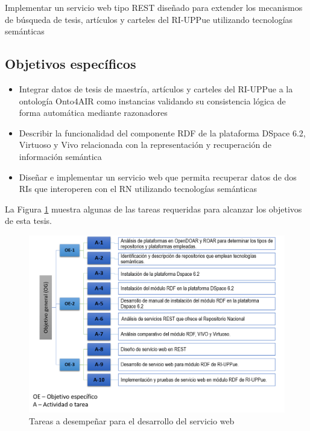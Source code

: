 Implementar un servicio web tipo REST dise\~{n}ado para extender los mecanismos de b\'usqueda de tesis, art\'iculos y carteles del RI-UPPue utilizando tecnolog\'ias sem\'anticas 

\subsection{Objetivos espec\'ificos}

\begin{itemize}
     \item  Integrar datos de tesis de maestr\'ia, art\'iculos y carteles del RI-UPPue a la ontolog\'ia Onto4AIR como instancias validando su consistencia l\'ogica de forma autom\'atica mediante razonadores

     \item Describir la funcionalidad del componente RDF de la plataforma DSpace 6.2, Virtuoso y Vivo relacionada con la representaci\'on y recuperaci\'on de informaci\'on sem\'antica
     
     \item Dise\~{n}ar e implementar un servicio web que permita recuperar datos de dos RIs que interoperen con el RN utilizando tecnolog\'ias sem\'anticas
   \end{itemize}
   
   
La Figura \ref{actividades_objetivos} muestra algunas de las tareas requeridas para alcanzar los objetivos de esta tesis. 

\begin{figure}[!ht]
    \centering
    \includegraphics[width=12cm]{figures/Actividades_Dic_2018.png} %
    \caption{Tareas a desempe\~{n}ar para el desarrollo del servicio web} %
    \label{actividades_objetivos}
\end{figure}

